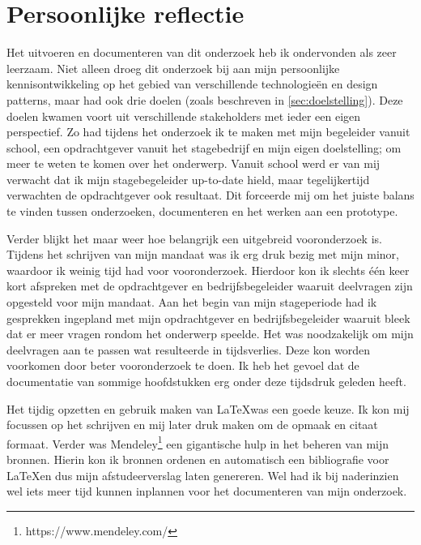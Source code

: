\chapter{Persoonlijke reflectie}
\label{ch:reflection}
Het uitvoeren en documenteren van dit onderzoek heb ik ondervonden als zeer leerzaam. Niet alleen droeg dit onderzoek bij aan mijn persoonlijke kennisontwikkeling op het gebied van verschillende technologieën en design patterns, maar had ook drie doelen (zoals beschreven in \autoref{sec:doelstelling}). Deze doelen kwamen voort uit verschillende stakeholders met ieder een eigen perspectief. Zo had tijdens het onderzoek ik te maken met mijn begeleider vanuit school, een opdrachtgever vanuit het stagebedrijf en mijn eigen doelstelling; om meer te weten te komen over het onderwerp. Vanuit school werd er van mij verwacht dat ik mijn stagebegeleider up-to-date hield, maar tegelijkertijd verwachten de opdrachtgever ook resultaat. Dit forceerde mij om het juiste balans te vinden tussen onderzoeken, documenteren en het werken aan een prototype.

Verder blijkt het maar weer hoe belangrijk een uitgebreid vooronderzoek is. Tijdens het schrijven van mijn mandaat was ik erg druk bezig met mijn minor, waardoor ik weinig tijd had voor vooronderzoek. Hierdoor kon ik slechts één keer kort afspreken met de opdrachtgever en bedrijfsbegeleider waaruit deelvragen zijn opgesteld voor mijn mandaat. Aan het begin van mijn stageperiode had ik gesprekken ingepland met mijn opdrachtgever en bedrijfsbegeleider waaruit bleek dat er meer vragen rondom het onderwerp speelde. Het was noodzakelijk om mijn deelvragen aan te passen wat resulteerde in tijdsverlies. Deze kon worden voorkomen door beter vooronderzoek te doen. Ik heb het gevoel dat de documentatie van sommige hoofdstukken erg onder deze tijdsdruk geleden heeft.

Het tijdig opzetten en gebruik maken van \LaTeX was een goede keuze. Ik kon mij focussen op het schrijven en mij later druk maken om de opmaak en citaat formaat. Verder was Mendeley\footnote{https://www.mendeley.com/} een gigantische hulp in het beheren van mijn bronnen. Hierin kon ik bronnen ordenen en automatisch een bibliografie voor \LaTeX en dus mijn afstudeerverslag laten genereren. Wel had ik bij naderinzien wel iets meer tijd kunnen inplannen voor het documenteren van mijn onderzoek.

